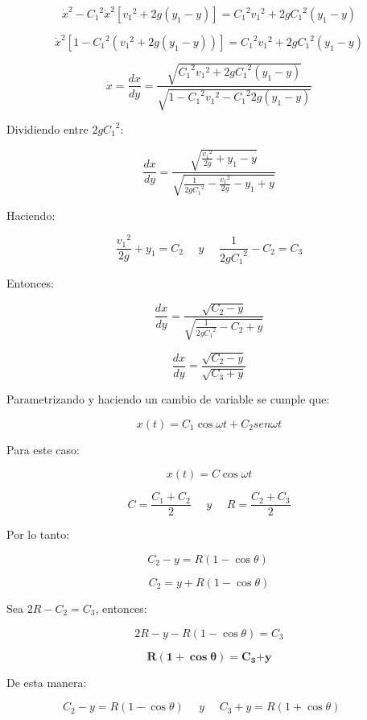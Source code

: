 \documentclass[]{article}
\begin{document}
\[{\dot{x}}^{2} - {C_{1}}^{2}{\dot{x}}^{2}\left\lbrack {v_{1}}^{2} + 2g\left( y_{1} - y \right) \right\rbrack = {C_{1}}^{2}{v_{1}}^{2} + 2g{C_{1}}^{2}\left( y_{1} - y \right)\]

\[{\dot{x}}^{2}\left\lbrack 1 - {C_{1}}^{2}\left( {v_{1}}^{2} + 2g\left( y_{1} - y \right) \right) \right\rbrack = {C_{1}}^{2}{v_{1}}^{2} + 2g{C_{1}}^{2}\left( y_{1} - y \right)\]

\[\dot{x} = \frac{dx}{dy} = \frac{\sqrt{{C_{1}}^{2}{v_{1}}^{2} + 2g{C_{1}}^{2}\left( y_{1} - y \right)}}{\sqrt{1 - {C_{1}}^{2}{v_{1}}^{2} - {C_{1}}^{2}2g\left( y_{1} - y \right)}}\]

Dividiendo entre \(2g{C_{1}}^{2}:\)

\[\frac{dx}{dy} = \frac{\sqrt{\frac{{v_{1}}^{2}}{2g} + y_{1} - y}}{\sqrt{\frac{1}{2g{C_{1}}^{2}} - \frac{{v_{1}}^{2}}{2g} - y_{1} + y}}\]

Haciendo:

\[\frac{{v_{1}}^{2}}{2g} + y_{1} = C_{2}\ \ \ \ \ \ y\ \ \ \ \ \ \frac{1}{2g{C_{1}}^{2}} - C_{2} = C_{3}\]

Entonces:

\[\frac{dx}{dy} = \frac{\sqrt{C_{2} - y}}{\sqrt{\frac{1}{2g{C_{1}}^{2}} - C_{2} + y}}\]

\[\frac{dx}{dy} = \frac{\sqrt{C_{2} - y}}{\sqrt{C_{3} + y}}\]

Parametrizando y haciendo un cambio de variable se cumple que:

\[x(t) = C_{1}\cos{\omega t} + C_{2}{sen}{\omega t}\]

Para este caso:

\[x(t) = C\cos{\omega t}\]

\[C = \frac{C_{1} + C_{2}}{2}\ \ \ \ \ \ y\ \ \ \ \ \ R = \frac{C_{2} + C_{3}}{2}\]

Por lo tanto:

\[C_{2} - y = R\left( 1 - \cos\theta \right)\ \]

\[C_{2} = y + R\left( 1 - \cos\theta \right)\]

Sea \(2R - C_{2} = C_{3}\), entonces:

\[2R - y - R\left( 1 - \cos\theta \right) = C_{3}\]

\[\mathbf{R}\left( \mathbf{1 +}\mathbf{\cos}\mathbf{\theta} \right)\mathbf{=}\mathbf{C}_{\mathbf{3}}\mathbf{+ y}\]

De esta manera:

\[C_{2} - y = R\left( 1 - \cos\theta \right)\ \ \ \ \ \ y\ \ \ \ \ \ C_{3} + y = R\left( 1 + \cos\theta \right)\ \ \ \ \ \ \]
\end{document}
